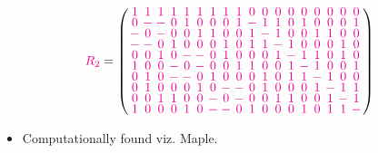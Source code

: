 \documentclass{beamer}
\newcommand{\mmag}[1]{\textcolor{magenta}{#1}}
\begin{document}
\begin{frame}

  \[
    \mmag{R_2} =
    \left(
      \arraycolsep=1.25pt\def\arraystretch{0.625}
      \begin{array}{cccccccccccccccccc}
        \mmag{1}&\mmag{1}&\mmag{1}&\mmag{1}&\mmag{1}&\mmag{1}&\mmag{1}&\mmag{1}&\mmag{1}&\mmag{0}&\mmag{0}&\mmag{0}&\mmag{0}&\mmag{0}&\mmag{0}&\mmag{0}&\mmag{0}&\mmag{0}\\
        \mmag{0}&\mmag{-}&\mmag{-}&\mmag{0}&\mmag{1}&\mmag{0}&\mmag{0}&\mmag{0}&\mmag{1}&\mmag{-}&\mmag{1}&\mmag{1}&\mmag{0}&\mmag{1}&\mmag{0}&\mmag{0}&\mmag{0}&\mmag{1}\\
        \mmag{-}&\mmag{0}&\mmag{-}&\mmag{0}&\mmag{0}&\mmag{1}&\mmag{1}&\mmag{0}&\mmag{0}&\mmag{1}&\mmag{-}&\mmag{1}&\mmag{0}&\mmag{0}&\mmag{1}&\mmag{1}&\mmag{0}&\mmag{0}\\
        \mmag{-}&\mmag{-}&\mmag{0}&\mmag{1}&\mmag{0}&\mmag{0}&\mmag{0}&\mmag{1}&\mmag{0}&\mmag{1}&\mmag{1}&\mmag{-}&\mmag{1}&\mmag{0}&\mmag{0}&\mmag{0}&\mmag{1}&\mmag{0}\\
        \mmag{0}&\mmag{0}&\mmag{1}&\mmag{0}&\mmag{-}&\mmag{-}&\mmag{0}&\mmag{1}&\mmag{0}&\mmag{0}&\mmag{0}&\mmag{1}&\mmag{-}&\mmag{1}&\mmag{1}&\mmag{0}&\mmag{1}&\mmag{0}\\
        \mmag{1}&\mmag{0}&\mmag{0}&\mmag{-}&\mmag{0}&\mmag{-}&\mmag{0}&\mmag{0}&\mmag{1}&\mmag{1}&\mmag{0}&\mmag{0}&\mmag{1}&\mmag{-}&\mmag{1}&\mmag{0}&\mmag{0}&\mmag{1}\\
        \mmag{0}&\mmag{1}&\mmag{0}&\mmag{-}&\mmag{-}&\mmag{0}&\mmag{1}&\mmag{0}&\mmag{0}&\mmag{0}&\mmag{1}&\mmag{0}&\mmag{1}&\mmag{1}&\mmag{-}&\mmag{1}&\mmag{0}&\mmag{0}\\
        \mmag{0}&\mmag{1}&\mmag{0}&\mmag{0}&\mmag{0}&\mmag{1}&\mmag{0}&\mmag{-}&\mmag{-}&\mmag{0}&\mmag{1}&\mmag{0}&\mmag{0}&\mmag{0}&\mmag{1}&\mmag{-}&\mmag{1}&\mmag{1}\\
        \mmag{0}&\mmag{0}&\mmag{1}&\mmag{1}&\mmag{0}&\mmag{0}&\mmag{-}&\mmag{0}&\mmag{-}&\mmag{0}&\mmag{0}&\mmag{1}&\mmag{1}&\mmag{0}&\mmag{0}&\mmag{1}&\mmag{-}&\mmag{1}\\
        \mmag{1}&\mmag{0}&\mmag{0}&\mmag{0}&\mmag{1}&\mmag{0}&\mmag{-}&\mmag{-}&\mmag{0}&\mmag{1}&\mmag{0}&\mmag{0}&\mmag{0}&\mmag{1}&\mmag{0}&\mmag{1}&\mmag{1}&\mmag{-}\\
      \end{array}
    \right)
  \]

  \begin{itemize}
  \item Computationally found viz. Maple.
  \end{itemize}
  
\end{frame}
\end{document}
